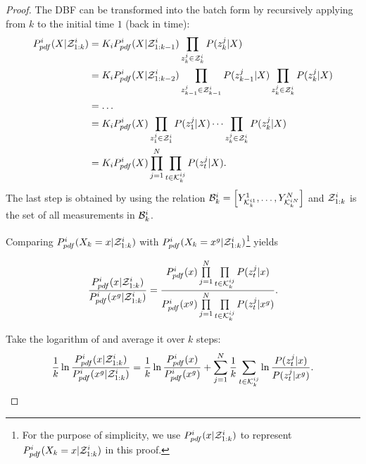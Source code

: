 	\begin{proof}	
		\textcolor{\revcol}{The DBF can be transformed into the batch form by recursively applying  from $k$ to the initial time $1$ (back in time):}
		\textcolor{\revcol}{
		\small\begin{align*}
		P^i_{pdf}(\X|\Z^i_{1:k})&=K_iP^i_{pdf}(\X|\Z^i_{1:k-1})\prod\limits_{z^j_k\in\Z^i_k}P(z^j_k|\X)\\
		&=K_iP^i_{pdf}(\X|\Z^i_{1:k-2})\prod\limits_{z^j_{k-1}\in\Z^i_{k-1}}P(z^j_{k-1}|\X)\prod\limits_{z^j_k\in\Z^i_k}P(z^j_k|\X)\\
		&=\dots\\
		&=K_iP^i_{pdf}(\X)\prod\limits_{z^j_1\in\Z^i_1}P(z^j_1|\X)\dots\prod\limits_{z^j_k\in\Z^i_k}P(z^j_k|\X)\\ %
		&=K_iP^i_{pdf}(\X)\prod\limits_{j=1}^{N}\prod\limits_{t\in\K^{ij}_{k}}P(z^j_t|\X).
		\end{align*}\normalsize
	The last step is obtained by using the relation $\mathcal{B}^i_k=\left[ Y^1_{\mathcal{K}^{i1}_k},\dots,Y^N_{\mathcal{K}^{iN}_k}\right]$ and $\mathcal{Z}^i_{1:k}$ is the set of all measurements in $\mathcal{B}^i_k$.}
		
		Comparing $P^i_{pdf}(X_k=x|\mathcal{Z}^i_{1:k})$ with $P^i_{pdf}(X_k=x^g|\mathcal{Z}^i_{1:k})$\footnote{For the purpose of simplicity, we use $P^i_{pdf}(x|\mathcal{Z}^i_{1:k})$ to represent $P^i_{pdf}(X_k=x|\mathcal{Z}^i_{1:k})$ in this proof.} yields
		
		\small\begin{equation}\label{eqn:cmp}
		\frac{P^i_{pdf}(x|\mathcal{Z}^i_{1:k})}{P^i_{pdf}(x^g|\mathcal{Z}^i_{1:k})}=\frac{P^i_{pdf}(x)\prod\limits_{j=1}^{N}\prod\limits_{t\in\mathcal{K}^{ij}_{k}}P(z^j_t|x)}{P^i_{pdf}(x^g)\prod\limits_{j=1}^{N}\prod\limits_{t\in\mathcal{K}^{ij}_{k}}P(z^j_t|x^g)}.
		\end{equation}\normalsize
		
		Take the logarithm of  and average it over $k$ steps:
		\small\begin{equation}\label{eqn:cmp_log}
		\frac{1}{k}\ln\frac{P^i_{pdf}(x|\mathcal{Z}^i_{1:k})}{P^i_{pdf}(x^g|\mathcal{Z}^i_{1:k})}=\frac{1}{k}\ln\frac{P^i_{pdf}(x)}{P^i_{pdf}(x^g)}+\sum\limits_{j=1}^{N}\frac{1}{k}\sum\limits_{t\in\mathcal{K}^{ij}_{k}}\ln\frac{P(z^j_t|x)}{P(z^j_t|x^g)}.
		\end{equation}\normalsize
		

\end{proof}
